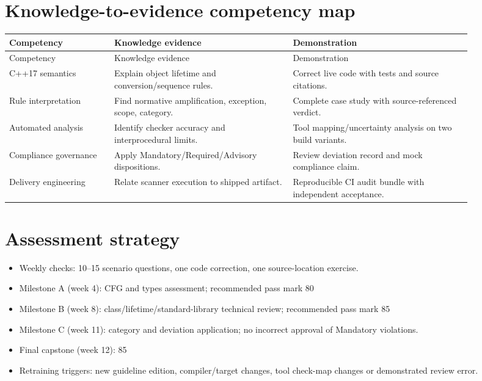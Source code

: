 \documentclass[10pt,letterpaper]{article}
\begin{document}
\section{Knowledge-to-evidence competency map}
\small\setlength{\tabcolsep}{3pt}\renewcommand{\arraystretch}{1.15}
\begin{longtable}{>{\raggedright\arraybackslash}p{0.2\linewidth}>{\raggedright\arraybackslash}p{0.34\linewidth}>{\raggedright\arraybackslash}p{0.34\linewidth}}
\toprule
Competency & Knowledge evidence & Demonstration\\ \midrule
\endfirsthead
\toprule
Competency & Knowledge evidence & Demonstration\\ \midrule
\endhead
C++17 semantics & Explain object lifetime and conversion/sequence rules. & Correct live code with tests and source citations.\\
Rule interpretation & Find normative amplification, exception, scope, category. & Complete case study with source-referenced verdict.\\
Automated analysis & Identify checker accuracy and interprocedural limits. & Tool mapping/uncertainty analysis on two build variants.\\
Compliance governance & Apply Mandatory/Required/Advisory dispositions. & Review deviation record and mock compliance claim.\\
Delivery engineering & Relate scanner execution to shipped artifact. & Reproducible CI audit bundle with independent acceptance.\\
\bottomrule
\end{longtable}
\normalsize

\section{Assessment strategy}
\begin{itemize}
\item Weekly checks: 10--15 scenario questions, one code correction, one source-location exercise.
\item Milestone A (week 4): CFG and types assessment; recommended pass mark 80%
\item Milestone B (week 8): class/lifetime/standard-library technical review; recommended pass mark 85%
\item Milestone C (week 11): category and deviation application; no incorrect approval of Mandatory violations.
\item Final capstone (week 12): 85%
\item Retraining triggers: new guideline edition, compiler/target changes, tool check-map changes or demonstrated review error.
\end{itemize}
\end{document}
